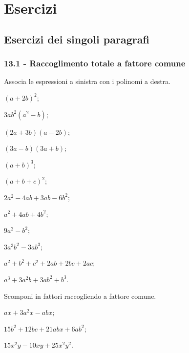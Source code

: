 \section{Esercizi}
\subsection{Esercizi dei singoli paragrafi}
\subsubsection*{13.1 - Raccoglimento totale a fattore comune}

\begin{esercizio}
\label{ese:13.1}
Associa le espressioni a sinistra con i polinomi a destra.
  \begin{multicols}{2}
\begin{enumeratea}
\item $(a+2b)^{2}$;
\item $3ab^{2}(a^{2}-b)$;
\item $(2a+3b)(a-2b)$;
\item $(3a-b)(3a+b)$;
\item $(a+b)^{3}$;
\item $(a+b+c)^{2}$;
\item $2a^{2}-4ab+3ab-6b^{2}$;
\item $a^{2}+4ab+4b^{2}$;
\item $9a^{2}-b^{2}$;
\item $3a^{3}b^{2}-3ab^{3}$;
\item $a^{2}+b^{2}+c^{2}+2ab+2bc+2ac$;
\item $a^{3}+3a^{2}b+3ab^{2}+b^{3}$.
\end{enumeratea}
  \end{multicols}
\end{esercizio}

\begin{esercizio}[\Ast]
\label{ese:13.2}
Scomponi in fattori raccogliendo a fattore comune.
\begin{multicols}{2}
\begin{enumeratea}
 \item $ax+3a^{2}x-abx$;
 \item $15b^{2}+12bc+21abx+6ab^{2}$;
 \item $15x^{2}y-10xy+25x^{2}y^{2}$.
\end{enumeratea}
\end{multicols}
\end{esercizio}

